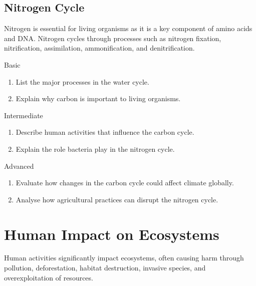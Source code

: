 \subsection{Nitrogen Cycle}

Nitrogen is essential for living organisms as it is a key component of amino acids and DNA. Nitrogen cycles through processes such as nitrogen fixation, nitrification, assimilation, ammonification, and denitrification.


\begin{tieredquestions}{Basic}
\begin{enumerate}
    \item List the major processes in the water cycle.
    \item Explain why carbon is important to living organisms.
\end{enumerate}
\end{tieredquestions}

\begin{tieredquestions}{Intermediate}
\begin{enumerate}
    \item Describe human activities that influence the carbon cycle.
    \item Explain the role bacteria play in the nitrogen cycle.
\end{enumerate}
\end{tieredquestions}

\begin{tieredquestions}{Advanced}
\begin{enumerate}
    \item Evaluate how changes in the carbon cycle could affect climate globally.
    \item Analyse how agricultural practices can disrupt the nitrogen cycle.
\end{enumerate}
\end{tieredquestions}

\section{Human Impact on Ecosystems}

Human activities significantly impact ecosystems, often causing harm through pollution, deforestation, habitat destruction, invasive species, and overexploitation of resources.

